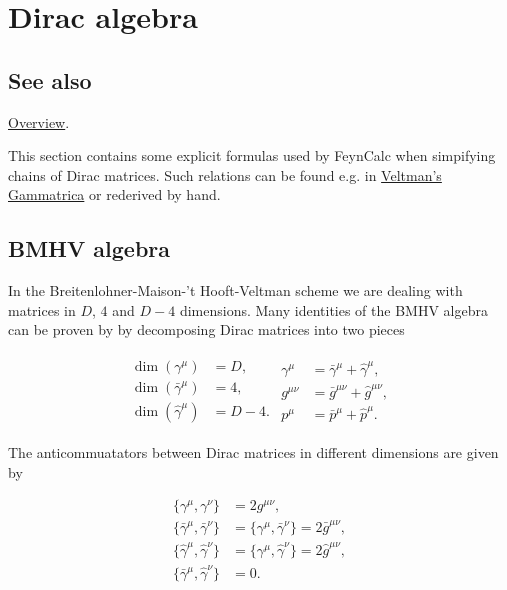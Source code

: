 \documentclass[../FeynCalcManual.tex]{subfiles}
\begin{document}
\hypertarget{dirac algebra}{
\section{Dirac algebra}\label{dirac algebra}}

\subsection{See also}

\hyperlink{toc}{Overview}.

This section contains some explicit formulas used by FeynCalc when
simpifying chains of Dirac matrices. Such relations can be found e.g. in
\href{https:/XXX}{Veltman's Gammatrica} or rederived by hand.

\hypertarget{bmhv-algebra}{%
\subsection{BMHV algebra}\label{bmhv-algebra}}

In the Breitenlohner-Maison-'t Hooft-Veltman scheme we are dealing with
matrices in \(D\), \(4\) and \(D-4\) dimensions. Many identities of the
BMHV algebra can be proven by by decomposing Dirac matrices into two
pieces

\begin{align}
\begin{split}
\dim(\gamma^\mu) &= D, \\
\dim(\bar{\gamma}^\mu) &= 4, \\
\dim(\hat{\gamma}^\mu) &= D-4 .
\end{split}
\begin{split}
\gamma^\mu &= \bar{\gamma}^\mu +\hat{\gamma}^\mu, \\
g^{\mu \nu} &= \bar{g}^{\mu \nu} + \hat{g}^{\mu \nu}, \\
p^\mu & = \bar{p}^\mu + \hat{p}^\mu.
\end{split}
\end{align}

The anticommuatators between Dirac matrices in different dimensions are
given by

\begin{align}
\{ \gamma^\mu, \gamma^\nu \} &= 2 g^{\mu \nu}, \\
\{ \bar{\gamma}^\mu, \bar{\gamma}^\nu \} &= \{ \gamma^\mu, \bar{\gamma}^\nu \} = 2 \bar{g}^{\mu \nu}, \\
\{ \hat{\gamma}^\mu, \hat{\gamma}^\nu \} &= \{ \gamma^\mu, \hat{\gamma}^\nu \} = 2 \hat{g}^{\mu \nu}, \\
\{ \bar{\gamma}^\mu, \hat{\gamma}^\nu \} &= 0.
\end{align}
\end{document}
